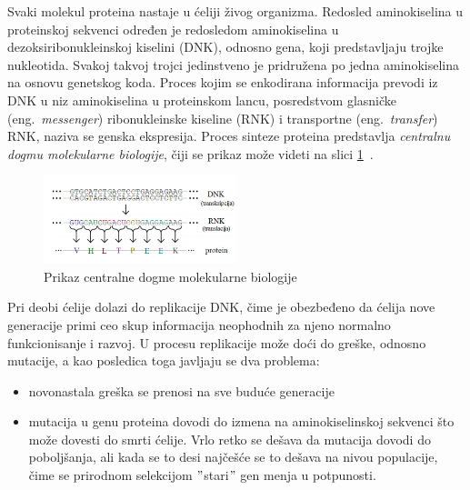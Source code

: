 Svaki molekul proteina nastaje u ćeliji živog organizma. Redosled aminokiselina u proteinskoj sekvenci određen je redosledom aminokiselina u dezoksiribonukleinskoj kiselini (DNK), odnosno gena, koji predstavljaju trojke nukleotida. Svakoj takvoj trojci jedinstveno je pridružena po jedna aminokiselina na osnovu genetskog koda. Proces kojim se enkodirana informacija prevodi iz DNK u niz aminokiselina u proteinskom lancu, posredstvom glasničke (eng.~{\em messenger}) ribonukleinske kiseline (RNK) i transportne (eng.~{\em transfer}) RNK, naziva se genska ekspresija. Proces sinteze proteina predstavlja \textit{centralnu dogmu molekularne biologije}, čiji se prikaz može videti na slici \ref{fig:dogma}~\cite{JKd}.

\begin{figure}[h]
	\centering
    \includegraphics[width=0.5\textwidth]{Figures/BO/dogma.png}
    \caption{Prikaz centralne dogme molekularne biologije~\cite{JKd}}
    \label{fig:dogma}
\end{figure}

Pri deobi ćelije dolazi do replikacije DNK, čime je obezbeđeno da ćelija nove generacije primi ceo skup informacija neophodnih za njeno normalno funkcionisanje i razvoj. U procesu replikacije može doći do greške, odnosno mutacije, a kao posledica toga javljaju se dva problema:
\begin{itemize}
\item novonastala greška se prenosi na sve buduće generacije
\item  mutacija u genu proteina dovodi do izmena na aminokiselinskoj sekvenci što može dovesti do smrti ćelije. Vrlo retko se dešava da mutacija dovodi do poboljšanja, ali kada se to desi najčešće se to dešava na nivou populacije, čime se prirodnom selekcijom $"$stari$"$ gen menja u potpunosti. 
\end{itemize} ~\citep{Principi}


